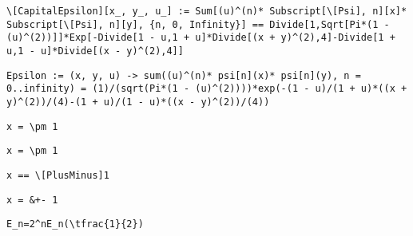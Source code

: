 \newsavebox\ANMM
\begin{lrbox}{\ANMM}
 \begin{minipage}[t]{0.82\textwidth}
  \lstinline[language={[latex]TeX},mathescape,breaklines=true]"\[CapitalEpsilon][x_, y_, u_] := Sum[(u)^(n)* Subscript[\[Psi], n][x]* Subscript[\[Psi], n][y], {n, 0, Infinity}] == Divide[1,Sqrt[Pi*(1 - (u)^(2))]]*Exp[-Divide[1 - u,1 + u]*Divide[(x + y)^(2),4]-Divide[1 + u,1 - u]*Divide[(x - y)^(2),4]]"
 \end{minipage}
\end{lrbox}
\newsavebox\ANMA
\begin{lrbox}{\ANMA}
 \begin{minipage}[t]{0.82\textwidth}
  \lstinline[language={[latex]TeX},mathescape,breaklines=true]"Epsilon := (x, y, u) -> sum((u)^(n)* psi[n](x)* psi[n](y), n = 0..infinity) = (1)/(sqrt(Pi*(1 - (u)^(2))))*exp(-(1 - u)/(1 + u)*((x + y)^(2))/(4)-(1 + u)/(1 - u)*((x - y)^(2))/(4))"
 \end{minipage}
\end{lrbox}
\newsavebox\AOT
\begin{lrbox}{\AOT}
 \begin{minipage}[t]{0.82\textwidth}
  \lstinline[language={[latex]TeX},mathescape,breaklines=true]"x = \pm 1"
 \end{minipage}
\end{lrbox}
\newsavebox\AOST
\begin{lrbox}{\AOST}
 \begin{minipage}[t]{0.82\textwidth}
  \lstinline[language={[latex]TeX},mathescape,breaklines=true]"x = \pm 1"
 \end{minipage}
\end{lrbox}
\newsavebox\AOMM
\begin{lrbox}{\AOMM}
 \begin{minipage}[t]{0.82\textwidth}
  \lstinline[language={[latex]TeX},mathescape,breaklines=true]"x == \[PlusMinus]1"
 \end{minipage}
\end{lrbox}
\newsavebox\AOMA
\begin{lrbox}{\AOMA}
 \begin{minipage}[t]{0.82\textwidth}
  \lstinline[language={[latex]TeX},mathescape,breaklines=true]"x = &+- 1"
 \end{minipage}
\end{lrbox}
\newsavebox\APT
\begin{lrbox}{\APT}
 \begin{minipage}[t]{0.82\textwidth}
  \lstinline[language={[latex]TeX},mathescape,breaklines=true]"E_n=2^nE_n(\tfrac{1}{2})"
 \end{minipage}
\end{lrbox}
